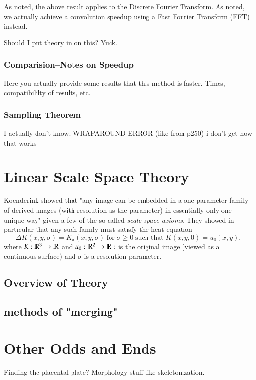 		As noted, the above result applies to the Discrete Fourier Transform. As noted, we actually achieve a convolution speedup using a Fast Fourier Transform (FFT) instead.
		
		Should  I put theory in on this? Yuck.
		
		\subsubsection{Comparision--Notes on Speedup}
		
		Here you actually provide some results that this method is faster. Times, compatibililty of results, etc.
		
		\subsubsection{Sampling Theorem}
		I actually don't know.
		WRAPAROUND ERROR (like from p250) i don't get how that works
\section{Linear Scale Space Theory}
	Koenderink showed that "any image can be embedded in a one-parameter family of derived images (with resolution as the parameter) in essentially only one unique way" given a few of the so-called \textit{scale space axioms}. They showed in particular that any such family must satisfy the heat equation
	\begin{equation}
		\Delta K(x,y,\sigma) = K_\sigma (x,y,\sigma) 
		\;\text{for}\; \sigma \ge 0
		\;\text{such that}\; K(x,y, 0) = u_0(x,y).
		\end{equation}
		where $K: \mathbb{R}^3 \to \mathbb{R} $ and  $u_0: \mathbb{R}^2 \to \mathbb{R}: $ is the original image (viewed as a continuous surface) and $\sigma$ is a resolution parameter.
	\subsection{Overview of Theory}
	\subsection{methods of "merging"}
\section{Other Odds and Ends} Finding the placental plate? Morphology stuff like skeletonization.



